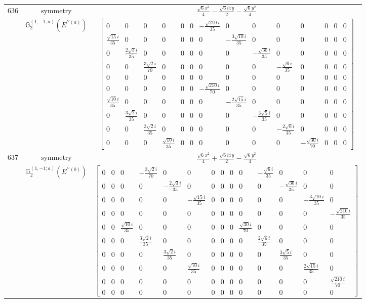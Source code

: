 \documentclass[fleqn,8pt,landscape]{jsarticle}
\begin{document}
\begin{longtable}{ccc}
$ 636 $ & $ \text{symmetry} $ & $ \frac{\sqrt{6} x^{2}}{4} - \frac{\sqrt{6} i x y}{2} - \frac{\sqrt{6} y^{2}}{4} $ \\
$  $ & $ \mathbb{G}_{2}^{(1,-1;a)}(E^{\prime\prime(a)}) $ & $ \begin{bmatrix} 0 & 0 & 0 & 0 & 0 & 0 & - \frac{\sqrt{210} i}{35} & 0 & 0 & 0 & 0 & 0 & 0 & 0 \\ \frac{\sqrt{15} i}{35} & 0 & 0 & 0 & 0 & 0 & 0 & - \frac{3 \sqrt{10} i}{35} & 0 & 0 & 0 & 0 & 0 & 0 \\ 0 & \frac{2 \sqrt{3} i}{35} & 0 & 0 & 0 & 0 & 0 & 0 & - \frac{\sqrt{30} i}{35} & 0 & 0 & 0 & 0 & 0 \\ 0 & 0 & \frac{3 \sqrt{2} i}{70} & 0 & 0 & 0 & 0 & 0 & 0 & - \frac{\sqrt{6} i}{35} & 0 & 0 & 0 & 0 \\ 0 & 0 & 0 & 0 & 0 & 0 & 0 & 0 & 0 & 0 & 0 & 0 & 0 & 0 \\ 0 & 0 & 0 & 0 & 0 & 0 & - \frac{\sqrt{210} i}{70} & 0 & 0 & 0 & 0 & 0 & 0 & 0 \\ \frac{\sqrt{10} i}{35} & 0 & 0 & 0 & 0 & 0 & 0 & - \frac{2 \sqrt{15} i}{35} & 0 & 0 & 0 & 0 & 0 & 0 \\ 0 & \frac{3 \sqrt{2} i}{35} & 0 & 0 & 0 & 0 & 0 & 0 & - \frac{3 \sqrt{5} i}{35} & 0 & 0 & 0 & 0 & 0 \\ 0 & 0 & \frac{3 \sqrt{2} i}{35} & 0 & 0 & 0 & 0 & 0 & 0 & - \frac{2 \sqrt{6} i}{35} & 0 & 0 & 0 & 0 \\ 0 & 0 & 0 & \frac{\sqrt{10} i}{35} & 0 & 0 & 0 & 0 & 0 & 0 & - \frac{\sqrt{30} i}{70} & 0 & 0 & 0 \end{bmatrix} $ \\ \hline
$ 637 $ & $ \text{symmetry} $ & $ \frac{\sqrt{6} x^{2}}{4} + \frac{\sqrt{6} i x y}{2} - \frac{\sqrt{6} y^{2}}{4} $ \\
$  $ & $ \mathbb{G}_{2}^{(1,-1;a)}(E^{\prime\prime(b)}) $ & $ \begin{bmatrix} 0 & 0 & 0 & - \frac{3 \sqrt{2} i}{70} & 0 & 0 & 0 & 0 & 0 & 0 & - \frac{\sqrt{6} i}{35} & 0 & 0 & 0 \\ 0 & 0 & 0 & 0 & - \frac{2 \sqrt{3} i}{35} & 0 & 0 & 0 & 0 & 0 & 0 & - \frac{\sqrt{30} i}{35} & 0 & 0 \\ 0 & 0 & 0 & 0 & 0 & - \frac{\sqrt{15} i}{35} & 0 & 0 & 0 & 0 & 0 & 0 & - \frac{3 \sqrt{10} i}{35} & 0 \\ 0 & 0 & 0 & 0 & 0 & 0 & 0 & 0 & 0 & 0 & 0 & 0 & 0 & - \frac{\sqrt{210} i}{35} \\ 0 & 0 & \frac{\sqrt{10} i}{35} & 0 & 0 & 0 & 0 & 0 & 0 & \frac{\sqrt{30} i}{70} & 0 & 0 & 0 & 0 \\ 0 & 0 & 0 & \frac{3 \sqrt{2} i}{35} & 0 & 0 & 0 & 0 & 0 & 0 & \frac{2 \sqrt{6} i}{35} & 0 & 0 & 0 \\ 0 & 0 & 0 & 0 & \frac{3 \sqrt{2} i}{35} & 0 & 0 & 0 & 0 & 0 & 0 & \frac{3 \sqrt{5} i}{35} & 0 & 0 \\ 0 & 0 & 0 & 0 & 0 & \frac{\sqrt{10} i}{35} & 0 & 0 & 0 & 0 & 0 & 0 & \frac{2 \sqrt{15} i}{35} & 0 \\ 0 & 0 & 0 & 0 & 0 & 0 & 0 & 0 & 0 & 0 & 0 & 0 & 0 & \frac{\sqrt{210} i}{70} \\ 0 & 0 & 0 & 0 & 0 & 0 & 0 & 0 & 0 & 0 & 0 & 0 & 0 & 0 \end{bmatrix} $ \\ \hline

\end{longtable}
\end{document}
